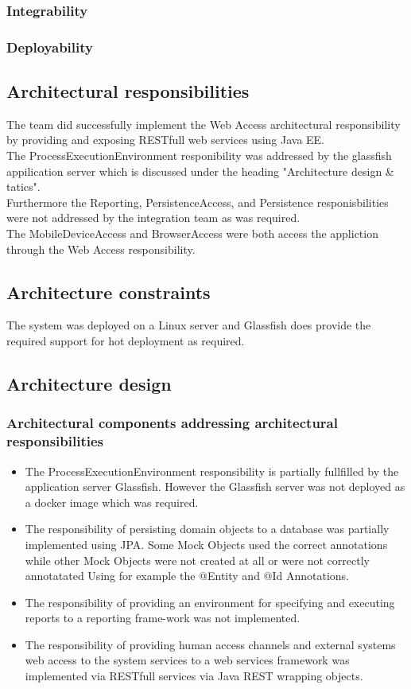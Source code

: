 \documentclass[a4paper,10pt]{article}
\begin{document}
\subsubsection{Integrability}

\subsubsection{Deployability}

\subsection{Architectural responsibilities}
The team did successfully implement the Web Access architectural responsibility by providing and exposing RESTfull web services using Java EE. \\
The ProcessExecutionEnvironment responibility was addressed by the glassfish appilication server which is discussed under the heading "Architecture design \& tatics". \\
Furthermore the Reporting, PersistenceAccess, and Persistence responisbilities were not addressed by the integration team as was required. \\
The MobileDeviceAccess and BrowserAccess were both access the appliction through the Web Access responsibility.

\subsection{Architecture constraints}
The system was deployed on a Linux server and Glassfish does provide the required support for hot deployment as required.

\subsection{Architecture design}
\subsubsection{Architectural components addressing architectural responsibilities}
\begin{itemize}
	\item The ProcessExecutionEnvironment responsibility is partially fullfilled by the application server Glassfish. However the Glassfish server was not deployed as a docker image which was required.
	\item The responsibility of persisting domain objects to a database was partially implemented using JPA. Some Mock Objects used the correct annotations
	while other Mock Objects were not created at all or were not correctly annotatated Using for example the @Entity and @Id Annotations.
	\item The responsibility of providing an environment for specifying and executing reports to a reporting frame-work was not implemented.
	\item The responsibility of providing human access channels and external systems web access to the system services to a web services framework was
	implemented via RESTfull services via Java REST wrapping objects.
\end{itemize}
\end{document}
